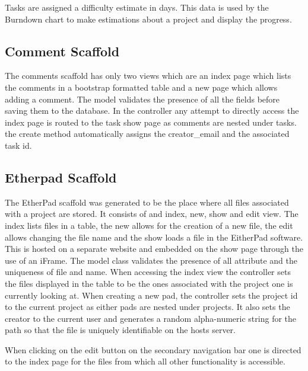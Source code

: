 \documentclass[a4wide, 11pt]{article}
\begin{document}
Tasks are assigned a difficulty estimate in days. This data is used by the Burndown chart to make estimations about a project and display the progress.

\subsection{Comment Scaffold}
The comments scaffold has only two views which are an index page which lists the comments in a bootstrap formatted table and a new page which allows adding a comment. The model validates the presence of all the fields before saving them to the database. In the controller any attempt to directly access the index page is routed to the task show page as comments are nested under tasks. the create method automatically assigns the creator_email and the associated task id.

\subsection{Etherpad Scaffold}
The EtherPad scaffold was generated to be the place where all files associated with a project are stored. It consists of and index, new, show and edit view. The index lists files in a table, the new allows for the creation of a new file, the edit allows changing the file name and the show loads a file in the EitherPad software. This is hosted on a separate website and embedded on the show page through the use of an iFrame. The model class validates the presence of all attribute and the uniqueness of file and name. When accessing the index view the controller sets the files displayed in the table to be the ones associated with the project one is currently looking at. When creating a new pad, the controller sets the project id to the current project as either pads are nested under projects. It also sets the creator to the current user and generates a random alpha-numeric string for the path so that the file is uniquely identifiable on the hosts server. 

When clicking on the edit button on the secondary navigation bar one is directed to the index page for the files from which all other functionality is accessible. 
\end{document}
